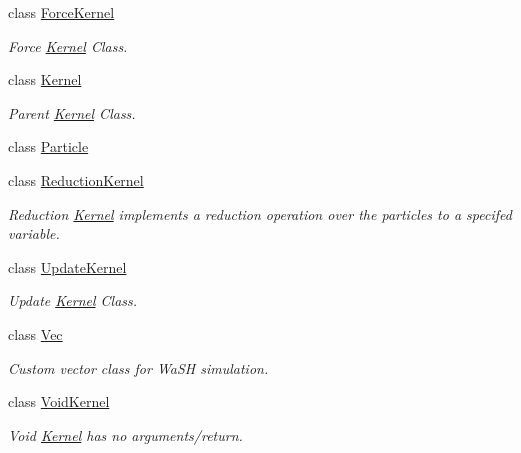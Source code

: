 \begin{DoxyCompactItemize}
\item 
class \mbox{\hyperlink{classwash_1_1ForceKernel}{Force\+Kernel}}
\begin{DoxyCompactList}\small\item\em Force \mbox{\hyperlink{classwash_1_1Kernel}{Kernel}} Class. \end{DoxyCompactList}\item 
class \mbox{\hyperlink{classwash_1_1Kernel}{Kernel}}
\begin{DoxyCompactList}\small\item\em Parent \mbox{\hyperlink{classwash_1_1Kernel}{Kernel}} Class. \end{DoxyCompactList}\item 
class \mbox{\hyperlink{classwash_1_1Particle}{Particle}}
\item 
class \mbox{\hyperlink{classwash_1_1ReductionKernel}{Reduction\+Kernel}}
\begin{DoxyCompactList}\small\item\em Reduction \mbox{\hyperlink{classwash_1_1Kernel}{Kernel}} implements a reduction operation over the particles to a specifed variable. \end{DoxyCompactList}\item 
class \mbox{\hyperlink{classwash_1_1UpdateKernel}{Update\+Kernel}}
\begin{DoxyCompactList}\small\item\em Update \mbox{\hyperlink{classwash_1_1Kernel}{Kernel}} Class. \end{DoxyCompactList}\item 
class \mbox{\hyperlink{classwash_1_1Vec}{Vec}}
\begin{DoxyCompactList}\small\item\em Custom vector class for Wa\+SH simulation. \end{DoxyCompactList}\item 
class \mbox{\hyperlink{classwash_1_1VoidKernel}{Void\+Kernel}}
\begin{DoxyCompactList}\small\item\em Void \mbox{\hyperlink{classwash_1_1Kernel}{Kernel}} has no arguments/return. \end{DoxyCompactList}\end{DoxyCompactItemize}
